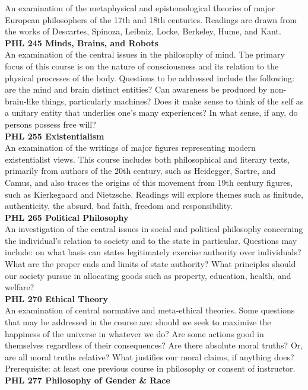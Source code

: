 \documentclass[
  letterpaper,
]{scrbook}
\begin{document}
An examination of the metaphysical and epistemological theories of major
European philosophers of the 17th and 18th centuries. Readings are drawn
from the works of Descartes, Spinoza, Leibniz, Locke, Berkeley, Hume,
and Kant.\\
\textbf{PHL 245 Minds, Brains, and Robots}\\
An examination of the central issues in the philosophy of mind. The
primary focus of this course is on the nature of consciousness and its
relation to the physical processes of the body. Questions to be
addressed include the following: are the mind and brain distinct
entities? Can awareness be produced by non-brain-like things,
particularly machines? Does it make sense to think of the self as a
unitary entity that underlies one's many experiences? In what sense, if
any, do persons possess free will?\\
\textbf{PHL 255 Existentialism}\\
An examination of the writings of major figures representing modern
existentialist views. This course includes both philosophical and
literary texts, primarily from authors of the 20th century, such as
Heidegger, Sartre, and Camus, and also traces the origins of this
movement from 19th century figures, such as Kierkegaard and Nietzsche.
Readings will explore themes such as finitude, authenticity, the absurd,
bad faith, freedom and responsibility.\\
\textbf{PHL 265 Political Philosophy}\\
An investigation of the central issues in social and political
philosophy concerning the individual's relation to society and to the
state in particular. Questions may include: on what basis can states
legitimately exercise authority over individuals? What are the proper
ends and limits of state authority? What principles should our society
pursue in allocating goods such as property, education, health, and
welfare?\\
\textbf{PHL 270 Ethical Theory}\\
An examination of central normative and meta-ethical theories. Some
questions that may be addressed in the course are: should we seek to
maximize the happiness of the universe in whatever we do? Are some
actions good in themselves regardless of their consequences? Are there
absolute moral truths? Or, are all moral truths relative? What justifies
our moral claims, if anything does? Prerequisite: at least one previous
course in philosophy or consent of instructor.\\
\textbf{PHL 277 Philosophy of Gender \& Race}\\
\end{document}

